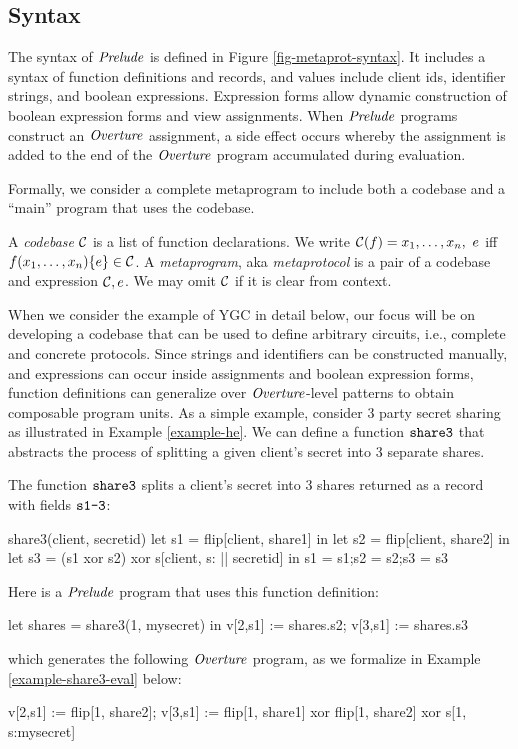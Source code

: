 \subsection{Syntax}

The syntax of $\mathit{Prelude}$ is defined in Figure
\ref{fig-metaprot-syntax}.  It includes a syntax of function
definitions and records, and values include client ids, identifier
strings, and boolean expressions. Expression forms allow dynamic
construction of boolean expression forms and view assignments. When
$\mathit{Prelude}$ programs construct an $\mathit{Overture}$ assignment, a side effect
occurs whereby the assignment is added to the end of the $\mathit{Overture}$
program accumulated during evaluation.

Formally, we consider a complete metaprogram to include both a
codebase and a ``main'' program that uses the codebase. 
\begin{definition}
A \emph{codebase} $\mathcal{C}$ is a list of function 
declarations. We write $ \mathcal{C}(f) = x_1,\ldots,x_n,\ e$
iff $f(x_1,\ldots,x_n) \{ e \} \in \mathcal{C}$.
A \emph{metaprogram}, aka \emph{metaprotocol}  is a pair of a 
codebase and expression $\mathcal{C}, e$. We may omit
$\mathcal{C}$ if it is clear from context.  
\end{definition}

When we consider the example of YGC in detail below, our focus will be
on developing a codebase that can be used to define arbitrary
circuits, i.e., complete and concrete protocols. Since strings and
identifiers can be constructed manually, and expressions can occur
inside assignments and boolean expression forms, function definitions
can generalize over $\mathit{Overture}$-level patterns to obtain composable
program units. As a simple example, consider 3 party secret
sharing as illustrated in Example \ref{example-he}. We can
define a function $\texttt{share3}$ that abstracts the process
of splitting a given client's secret into 3 separate shares.
\begin{example} \label{example-share3} The function $\texttt{share3}$ 
  splits a client's secret into 3 shares returned as a record
  with fields $\texttt{s1-3}$:
  {\small
  \begin{verbatimtab}
      share3(client, secretid) {
        let s1 = flip[client, share1] in
        let s2 = flip[client, share2] in
        let s3 = (s1 xor s2) xor s[client, s: || secretid] in
        {s1 = s1;s2 = s2;s3 = s3}
      } \end{verbatimtab}
  }
  Here is a $\mathit{Prelude}$ program that uses this function definition:
  {\small
    \begin{verbatimtab}
      let shares = share3(1, mysecret) in
      v[2,s1] := shares.s2;
      v[3,s1] := shares.s3 \end{verbatimtab}
  }
  which generates the following $\mathit{Overture}$ program, as we formalize in Example \ref{example-share3-eval}
  below:
  {\small
  \begin{verbatimtab}
      v[2,s1] := flip[1, share2];
      v[3,s1] := flip[1, share1] xor flip[1, share2] xor s[1, s:mysecret] \end{verbatimtab}
  }
\end{example}

